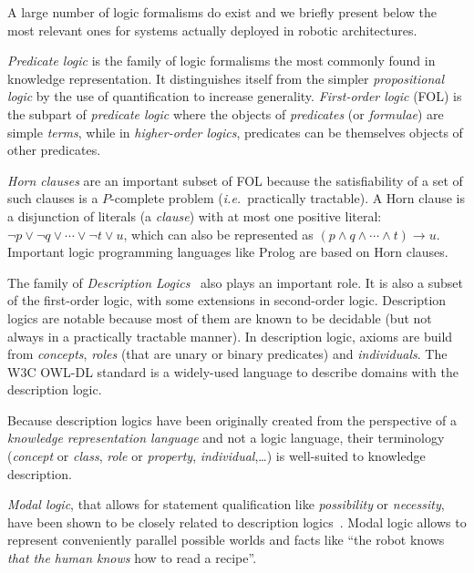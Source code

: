 \documentclass[a4paper, twocolumn]{article}
\newcommand{\ie}{{\textit{i.e.\ }}}
\begin{document}
A large number of logic formalisms do exist and we briefly present below the most
relevant ones for systems actually deployed in robotic architectures.

\emph{Predicate logic} is the family of logic formalisms the most commonly
found in knowledge representation. It distinguishes itself from the simpler
\emph{propositional logic} by the use of quantification to increase generality.
\emph{First-order logic} (FOL) is the subpart of \emph{predicate logic} where the
objects of \emph{predicates} (or \emph{formulae}) are simple \emph{terms},
while in \emph{higher-order logics}, predicates can be themselves objects of
other predicates.

\emph{Horn clauses} are an important subset of FOL because the satisfiability
of a set of such clauses is a $P$-complete problem (\ie practically tractable).
A Horn clause is a disjunction of literals (a \emph{clause}) with at most one
positive literal: $\neg p \lor \neg q \lor \cdots \lor \neg t \lor u$, which
can also be represented as $(p \land q \land \cdots \land t) \rightarrow u$.
Important logic programming languages like Prolog are based on Horn clauses.

The family of \emph{Description Logics}~\cite{Baader2008} also plays an
important role. It is also a subset of the first-order logic, with some
extensions in second-order logic. Description logics are notable because most
of them are known to be decidable (but not always in a practically tractable
manner). In description logic, axioms are build from \emph{concepts},
\emph{roles} (that are unary or binary predicates) and \emph{individuals}. The
W3C OWL-DL standard is a widely-used language to describe domains with the
description logic.

Because description logics have been originally created from the perspective of
a \emph{knowledge representation language} and not a logic language, their
terminology (\emph{concept} or \emph{class}, \emph{role} or \emph{property},
\emph{individual},\ldots) is well-suited to knowledge description.

\emph{Modal logic}, that allows for statement qualification like
\emph{possibility} or \emph{necessity}, have been shown to be closely related
to description logics~\cite{Baader2001}. Modal logic allows to represent conveniently parallel
possible worlds and facts like ``the robot knows \emph{that the human knows}
how to read a recipe''.

\end{document}
